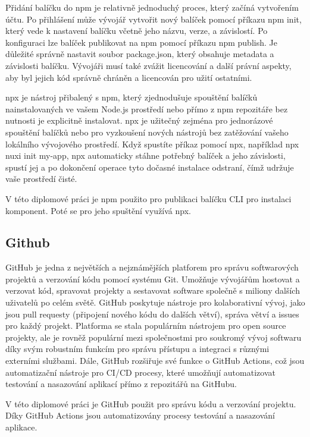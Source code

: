 Přidání balíčku do npm je relativně jednoduchý proces, který začíná vytvořením účtu. Po přihlášení může vývojář vytvořit nový balíček pomocí příkazu npm init, který vede k nastavení balíčku včetně jeho názvu, verze, a závislostí. Po konfiguraci lze balíček publikovat na npm pomocí příkazu npm publish. Je důležité správně nastavit soubor package.json, který obsahuje metadata a závislosti balíčku. Vývojáři musí také zvážit licencování a další právní aspekty, aby byl jejich kód správně chráněn a licencován pro užití ostatními.

npx je nástroj přibalený s npm, který zjednodušuje spouštění balíčků nainstalovaných ve vašem Node.js prostředí nebo přímo z npm repozitáře bez nutnosti je explicitně instalovat. npx je užitečný zejména pro jednorázové spouštění balíčků nebo pro vyzkoušení nových nástrojů bez zatěžování vašeho lokálního vývojového prostředí. Když spustíte příkaz pomocí npx, například npx nuxi init my-app, npx automaticky stáhne potřebný balíček a jeho závislosti, spustí jej a po dokončení operace tyto dočasné instalace odstraní, čímž udržuje vaše prostředí čisté.

V této diplomové práci je npm použito pro publikaci balíčku CLI pro instalaci komponent. Poté se pro jeho spuštění využívá npx.

\subsection{Github}
GitHub je jedna z největších a nejznámějších platforem pro správu softwarových projektů a verzování kódu pomocí systému Git. Umožňuje vývojářům hostovat a verzovat kód, spravovat projekty a sestavovat software společně s miliony dalších uživatelů po celém světě. GitHub poskytuje nástroje pro kolaborativní vývoj, jako jsou pull requesty (připojení nového kódu do dalších větví), správa větví a issues pro každý projekt. Platforma se stala populárním nástrojem pro open source projekty, ale je rovněž populární mezi společnostmi pro soukromý vývoj softwaru díky svým robustním funkcím pro správu přístupu a integraci s různými externími službami. Dále, GitHub rozšiřuje své funkce o GitHub Actions, což jsou automatizační nástroje pro CI/CD procesy, které umožňují automatizovat testování a nasazování aplikací přímo z repozitářů na GitHubu. \cite{Github}

V této diplomové práci je GitHub použit pro správu kódu a verzování projektu. Díky GitHub Actions jsou automatizovány procesy testování a nasazování aplikace.

